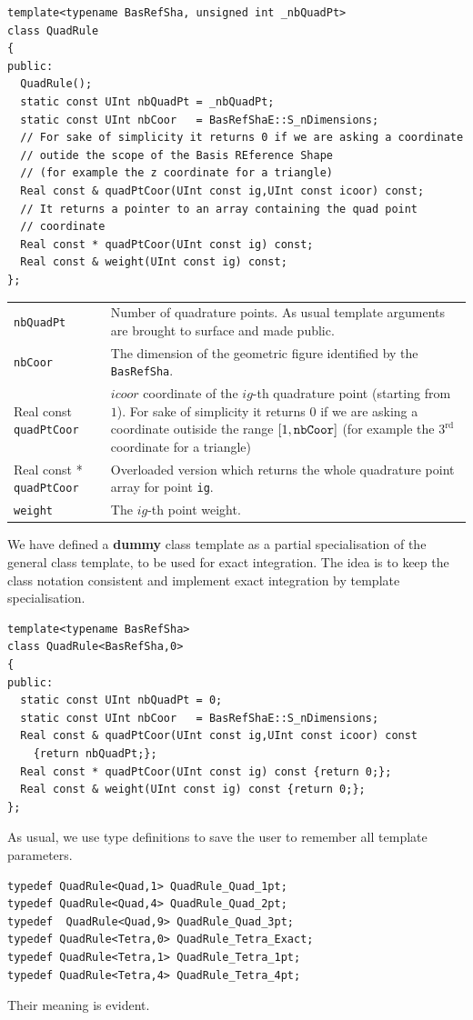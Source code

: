 \begin{verbatim}
template<typename BasRefSha, unsigned int _nbQuadPt>
class QuadRule
{
public:
  QuadRule();
  static const UInt nbQuadPt = _nbQuadPt;
  static const UInt nbCoor   = BasRefShaE::S_nDimensions;
  // For sake of simplicity it returns 0 if we are asking a coordinate
  // outide the scope of the Basis REference Shape 
  // (for example the z coordinate for a triangle)
  Real const & quadPtCoor(UInt const ig,UInt const icoor) const; 
  // It returns a pointer to an array containing the quad point
  // coordinate
  Real const * quadPtCoor(UInt const ig) const;
  Real const & weight(UInt const ig) const;
};
\end{verbatim}
\begin{tabularx}{\textwidth}{lX}
  \hline \texttt{nbQuadPt} & Number of quadrature points. As usual
  template arguments are
  brought to surface and made public.\\
  \texttt{nbCoor} & The dimension of the geometric figure identified
  by the
  \texttt{BasRefSha}.\\
  Real const \texttt{quadPtCoor} & $icoor$ coordinate of the $ig$-th
  quadrature point (starting from $1$). For sake of simplicity it
  returns 0 if we are asking a coordinate outiside the range
  $[1,\text{\texttt{nbCoor}}]$
  (for example the $3^{\text{rd}}$ coordinate for a triangle)\\
  Real const * \texttt{quadPtCoor} & Overloaded version which returns
  the whole
  quadrature point array for point \texttt{ig}.\\
  \texttt{weight} & The $ig$-th point weight.\\
  \hline
\end{tabularx}
We have defined a \textbf{dummy} class template as a partial specialisation
of the general class template, to be used  for exact integration. 
The idea is to keep the class notation consistent and implement exact integration
by template specialisation.
\begin{verbatim}
template<typename BasRefSha>
class QuadRule<BasRefSha,0>
{
public:
  static const UInt nbQuadPt = 0;
  static const UInt nbCoor   = BasRefShaE::S_nDimensions;
  Real const & quadPtCoor(UInt const ig,UInt const icoor) const 
    {return nbQuadPt;};
  Real const * quadPtCoor(UInt const ig) const {return 0;};
  Real const & weight(UInt const ig) const {return 0;};
};
\end{verbatim}

As usual, we use type definitions to save the user to remember all template
parameters.
\begin{verbatim}
typedef QuadRule<Quad,1> QuadRule_Quad_1pt;
typedef QuadRule<Quad,4> QuadRule_Quad_2pt;
typedef  QuadRule<Quad,9> QuadRule_Quad_3pt;
typedef QuadRule<Tetra,0> QuadRule_Tetra_Exact;
typedef QuadRule<Tetra,1> QuadRule_Tetra_1pt;
typedef QuadRule<Tetra,4> QuadRule_Tetra_4pt;
\end{verbatim}
Their meaning is evident.
